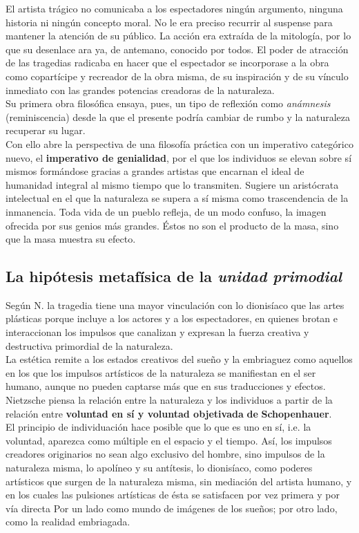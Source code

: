 \documentclass[a4paper, 10pt, twocolumn, spanish]{article}
\begin{document}
El artista trágico no comunicaba a los espectadores ningún argumento,
ninguna historia ni ningún concepto moral. No le era preciso recurrir
al suspense para mantener la atención de su público. La acción era
extraída de la mitología, por lo que su desenlace ara ya, de antemano,
conocido por todos. El poder de atracción de las tragedias radicaba en
hacer que el espectador se incorporase a la obra como copartícipe y
recreador de la obra misma, de su inspiración y de su vínculo
inmediato con las grandes potencias creadoras de la naturaleza.\\[0pt]
Su primera obra filosófica ensaya, pues, un tipo de reflexión como
\emph{anámnesis} (reminiscencia) desde la que el presente podría cambiar de
rumbo y la naturaleza recuperar su lugar.\\[0pt]
Con ello abre la perspectiva de una filosofía práctica con un
imperativo categórico nuevo, el \textbf{imperativo de genialidad}, por el que
los individuos se elevan sobre sí mismos formándose gracias a grandes
artistas que encarnan el ideal de humanidad integral al mismo tiempo
que lo transmiten. Sugiere un aristócrata intelectual en el que la
naturaleza se supera a sí misma como trascendencia de la
inmanencia. Toda vida de un pueblo refleja, de un modo confuso, la
imagen ofrecida por sus genios más grandes. Éstos no son el producto
de la masa, sino que la masa muestra su efecto.

\subsection{La hipótesis metafísica de la \emph{unidad primodial}}
\label{sec:orga2d43bc}

Según N. la tragedia tiene una mayor vinculación con lo dionisíaco que
las artes plásticas porque incluye a los actores y a los espectadores,
en quienes brotan e interaccionan los impulsos que canalizan y
expresan la fuerza creativa y destructiva primordial de la
naturaleza.\\[0pt]
La estética remite a los estados creativos del sueño y la embriaguez
como aquellos en los que los impulsos artísticos de la naturaleza se
manifiestan en el ser humano, aunque no pueden captarse más que en sus
traducciones y efectos.\\[0pt]
Nietzsche piensa la relación entre la naturaleza y los individuos a
partir de la relación entre \textbf{voluntad en sí y voluntad objetivada}
\textbf{de} \textbf{Schopenhauer}.\\[0pt]
El principio de individuación hace posible que lo que es uno en sí,
i.e. la voluntad, aparezca como múltiple en el espacio y el
tiempo. Así, los impulsos creadores originarios no sean algo exclusivo
del hombre, sino impulsos de la naturaleza misma, lo apolíneo y su
antítesis, lo dionisíaco, como poderes artísticos que surgen de la
naturaleza misma, sin mediación del artista humano, y en los cuales
las pulsiones artísticas de ésta se satisfacen por vez primera y por
vía directa Por un lado como mundo de imágenes de los sueños; por otro
lado, como la realidad embriagada.\\[0pt]
\end{document}
